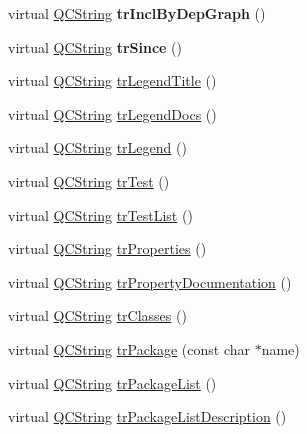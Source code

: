 \begin{DoxyCompactItemize}
virtual \mbox{\hyperlink{class_q_c_string}{Q\+C\+String}} {\bfseries tr\+Incl\+By\+Dep\+Graph} ()
\item 
\mbox{\label{class_translator_croatian_ad612ba457e11a6681090c2522d518693}} 
virtual \mbox{\hyperlink{class_q_c_string}{Q\+C\+String}} {\bfseries tr\+Since} ()
\item 
virtual \mbox{\hyperlink{class_q_c_string}{Q\+C\+String}} \mbox{\hyperlink{class_translator_croatian_a3250a15c3aca1451a0c2b3e83a56be4f}{tr\+Legend\+Title}} ()
\item 
virtual \mbox{\hyperlink{class_q_c_string}{Q\+C\+String}} \mbox{\hyperlink{class_translator_croatian_a85c56c6c507a473df17c1e1c0f66cd1e}{tr\+Legend\+Docs}} ()
\item 
virtual \mbox{\hyperlink{class_q_c_string}{Q\+C\+String}} \mbox{\hyperlink{class_translator_croatian_ae5663c0e12e544f6e4f769496eaada6d}{tr\+Legend}} ()
\item 
virtual \mbox{\hyperlink{class_q_c_string}{Q\+C\+String}} \mbox{\hyperlink{class_translator_croatian_abde32277d4a372a6b4de6aea3b84ce76}{tr\+Test}} ()
\item 
virtual \mbox{\hyperlink{class_q_c_string}{Q\+C\+String}} \mbox{\hyperlink{class_translator_croatian_aca1bdb7de19fc5f7ded7b96309f0e86a}{tr\+Test\+List}} ()
\item 
virtual \mbox{\hyperlink{class_q_c_string}{Q\+C\+String}} \mbox{\hyperlink{class_translator_croatian_a3a1b1d5789a54bcf391e4c68a9566b96}{tr\+Properties}} ()
\item 
virtual \mbox{\hyperlink{class_q_c_string}{Q\+C\+String}} \mbox{\hyperlink{class_translator_croatian_ac8e4063363ae2bac4f2defe0d8f369c1}{tr\+Property\+Documentation}} ()
\item 
virtual \mbox{\hyperlink{class_q_c_string}{Q\+C\+String}} \mbox{\hyperlink{class_translator_croatian_adf4e675c440e0f5215b77ce4fe211fa7}{tr\+Classes}} ()
\item 
virtual \mbox{\hyperlink{class_q_c_string}{Q\+C\+String}} \mbox{\hyperlink{class_translator_croatian_afe3230caf19cc47f690efbb4016a34e8}{tr\+Package}} (const char $\ast$name)
\item 
virtual \mbox{\hyperlink{class_q_c_string}{Q\+C\+String}} \mbox{\hyperlink{class_translator_croatian_ab798b026103bae5d4d01591dc5f12edc}{tr\+Package\+List}} ()
\item 
virtual \mbox{\hyperlink{class_q_c_string}{Q\+C\+String}} \mbox{\hyperlink{class_translator_croatian_adb6bcb67f2e75e9d2471cd26fe0027dc}{tr\+Package\+List\+Description}} ()

\end{DoxyCompactItemize}
